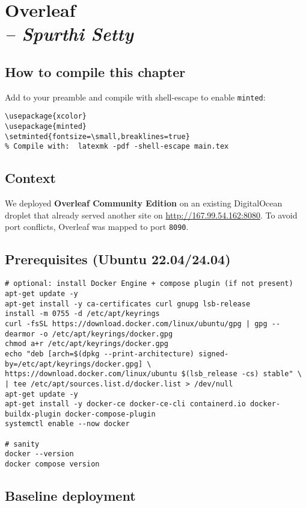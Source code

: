 \chapter{Overleaf \\
\small{\textit{-- Spurthi Setty}}
\label{Chapter::Overleaf}}

\section{How to compile this chapter}
Add to your preamble and compile with shell-escape to enable \texttt{minted}:
\begin{verbatim}
\usepackage{xcolor}
\usepackage{minted}
\setminted{fontsize=\small,breaklines=true}
% Compile with:  latexmk -pdf -shell-escape main.tex
\end{verbatim}

\section{Context}
We deployed \textbf{Overleaf Community Edition} on an existing DigitalOcean droplet that already served another site on \url{http://167.99.54.162:8080}. To avoid port conflicts, Overleaf was mapped to port \texttt{8090}.

\section{Prerequisites (Ubuntu 22.04/24.04)}
\begin{verbatim}
# optional: install Docker Engine + compose plugin (if not present)
apt-get update -y
apt-get install -y ca-certificates curl gnupg lsb-release
install -m 0755 -d /etc/apt/keyrings
curl -fsSL https://download.docker.com/linux/ubuntu/gpg | gpg --dearmor -o /etc/apt/keyrings/docker.gpg
chmod a+r /etc/apt/keyrings/docker.gpg
echo "deb [arch=$(dpkg --print-architecture) signed-by=/etc/apt/keyrings/docker.gpg] \
https://download.docker.com/linux/ubuntu $(lsb_release -cs) stable" \
| tee /etc/apt/sources.list.d/docker.list > /dev/null
apt-get update -y
apt-get install -y docker-ce docker-ce-cli containerd.io docker-buildx-plugin docker-compose-plugin
systemctl enable --now docker

# sanity
docker --version
docker compose version
\end{verbatim}

\section{Baseline deployment}
